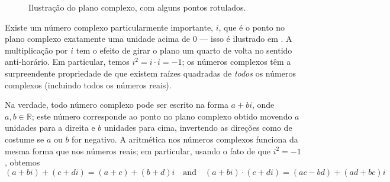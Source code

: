 \begin{figure}[p!]
\centering
{}
\caption{Ilustração do plano complexo, com alguns pontos rotulados.}
\label{figComplexNumbers}
\end{figure}

Existe um número complexo particularmente importante, $i$, que é o ponto no plano complexo exatamente uma unidade acima de $0$ --- isso é ilustrado em . A multiplicação por $i$ tem o efeito de girar o plano um quarto de volta no sentido anti-horário. Em particular, temos $i^2 = i \cdot i = -1$; os números complexos têm a surpreendente propriedade de que existem raízes quadradas de \textit{todos} os números complexos (incluindo todos os números reais).

Na verdade, todo número complexo pode ser escrito na forma $a+bi$, onde $a,b \in \mathbb{R}$; este número corresponde ao ponto no plano complexo obtido movendo $a$ unidades para a direita e $b$ unidades para cima, invertendo as direções como de costume se $a$ ou $b$ for negativo. A aritmética nos números complexos funciona da mesma forma que nos números reais; em particular, usando o fato de que $i^2=-1$, obtemos
\[ (a+bi)+(c+di) = (a+c)+(b+d)i \quad \text{and} \quad (a+bi) \cdot (c+di) = (ac-bd) + (ad+bc)i \]


